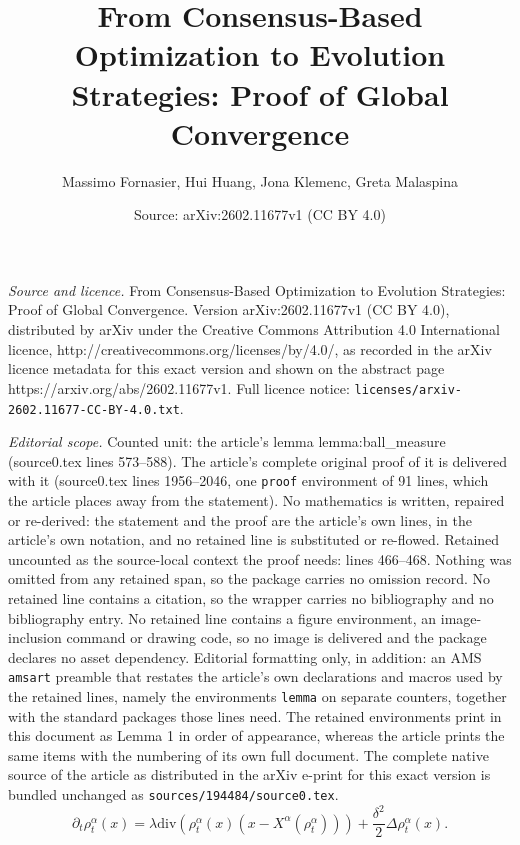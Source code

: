 \documentclass[10pt,a4paper]{amsart}
\title{From Consensus-Based Optimization to Evolution Strategies: Proof of Global Convergence}
\author{Massimo Fornasier, Hui Huang, Jona Klemenc, Greta Malaspina}
\date{Source: arXiv:2602.11677v1 (CC BY 4.0)}
\newcommand{\Xalpha}{{X^\alpha}}
\newcommand{\dv}{\mathrm{div}}
\begin{document}
\maketitle

\noindent\emph{Source and licence.} From Consensus-Based Optimization to Evolution Strategies: Proof of Global Convergence. Version arXiv:2602.11677v1 (CC BY 4.0), distributed by arXiv under the Creative Commons Attribution 4.0 International licence, http://creativecommons.org/licenses/by/4.0/, as recorded in the arXiv licence metadata for this exact version and shown on the abstract page https://arxiv.org/abs/2602.11677v1. Full licence notice: \texttt{licenses/arxiv-2602.11677-CC-BY-4.0.txt}.\par\smallskip

\noindent\textit{Editorial scope.} Counted unit: the article's lemma lemma:ball\_measure (source0.tex lines 573--588). The article's complete original proof of it is delivered with it (source0.tex lines 1956--2046, one \texttt{proof} environment of 91 lines, which the article places away from the statement). No mathematics is written, repaired or re-derived: the statement and the proof are the article's own lines, in the article's own notation, and no retained line is substituted or re-flowed.  Retained uncounted as the source-local context the proof needs: lines 466--468.  Nothing was omitted from any retained span, so the package carries no omission record.  No retained line contains a citation, so the wrapper carries no bibliography and no bibliography entry.  No retained line contains a figure environment, an image-inclusion command or drawing code, so no image is delivered and the package declares no asset dependency.  Editorial formatting only, in addition: an AMS \texttt{amsart} preamble that restates the article's own declarations and macros used by the retained lines, namely the environments \texttt{lemma} on separate counters, together with the standard packages those lines need.  The retained environments print in this document as Lemma 1 in order of appearance, whereas the article prints the same items with the numbering of its own full document.  The complete native source of the article as distributed in the arXiv e-print for this exact version is bundled unchanged as \texttt{sources/194484/source0.tex}.
\begin{equation}\label{eq:FP_CBO_delta}
\partial_t\rho^\alpha_t(x) = \lambda \dv\left(\rho^\alpha_t(x)(x-\Xalpha(\rho^\alpha_t))\right) +\frac{\delta^2}{2}\Delta \rho^\alpha_t(x).
\end{equation}
\end{document}
